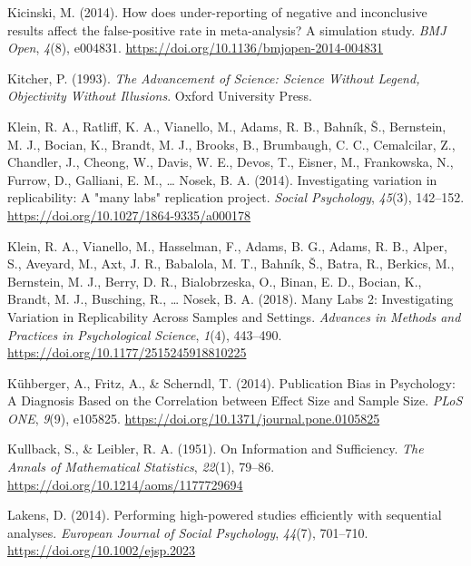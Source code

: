 \documentclass[
  12pt,
]{scrartcl}
\newlength{\cslhangindent}
\newenvironment{CSLReferences}[2] %
 {\begin{list}{}{%
  \setlength{\itemindent}{0pt}
  \setlength{\leftmargin}{0pt}
  \setlength{\parsep}{0pt}
  \ifodd #1
   \setlength{\leftmargin}{\cslhangindent}
   \setlength{\itemindent}{-1\cslhangindent}
  \fi
  \setlength{\itemsep}{#2\baselineskip}}}
 {\end{list}}
\begin{document}
\begin{CSLReferences}{1}{0}
Kicinski, M. (2014). How does under-reporting of negative and
inconclusive results affect the false-positive rate in meta-analysis?
{A} simulation study. \emph{BMJ Open}, \emph{4}(8), e004831.
\url{https://doi.org/10.1136/bmjopen-2014-004831}

Kitcher, P. (1993). \emph{The {Advancement} of {Science}: {Science}
{Without} {Legend}, {Objectivity} {Without} {Illusions}}. Oxford
University Press.

Klein, R. A., Ratliff, K. A., Vianello, M., Adams, R. B., Bahník, Š.,
Bernstein, M. J., Bocian, K., Brandt, M. J., Brooks, B., Brumbaugh, C.
C., Cemalcilar, Z., Chandler, J., Cheong, W., Davis, W. E., Devos, T.,
Eisner, M., Frankowska, N., Furrow, D., Galliani, E. M., \ldots{} Nosek,
B. A. (2014). Investigating variation in replicability: {A} "many labs"
replication project. \emph{Social Psychology}, \emph{45}(3), 142--152.
\url{https://doi.org/10.1027/1864-9335/a000178}

Klein, R. A., Vianello, M., Hasselman, F., Adams, B. G., Adams, R. B.,
Alper, S., Aveyard, M., Axt, J. R., Babalola, M. T., Bahník, Š., Batra,
R., Berkics, M., Bernstein, M. J., Berry, D. R., Bialobrzeska, O.,
Binan, E. D., Bocian, K., Brandt, M. J., Busching, R., \ldots{} Nosek,
B. A. (2018). Many {Labs} 2: {Investigating} {Variation} in
{Replicability} {Across} {Samples} and {Settings}. \emph{Advances in
Methods and Practices in Psychological Science}, \emph{1}(4), 443--490.
\url{https://doi.org/10.1177/2515245918810225}

Kühberger, A., Fritz, A., \& Scherndl, T. (2014). Publication {Bias} in
{Psychology}: {A} {Diagnosis} {Based} on the {Correlation} between
{Effect} {Size} and {Sample} {Size}. \emph{PLoS ONE}, \emph{9}(9),
e105825. \url{https://doi.org/10.1371/journal.pone.0105825}

Kullback, S., \& Leibler, R. A. (1951). On {Information} and
{Sufficiency}. \emph{The Annals of Mathematical Statistics},
\emph{22}(1), 79--86. \url{https://doi.org/10.1214/aoms/1177729694}

Lakens, D. (2014). Performing high-powered studies efficiently with
sequential analyses. \emph{European Journal of Social Psychology},
\emph{44}(7), 701--710. \url{https://doi.org/10.1002/ejsp.2023}


\end{CSLReferences}
\end{document}
